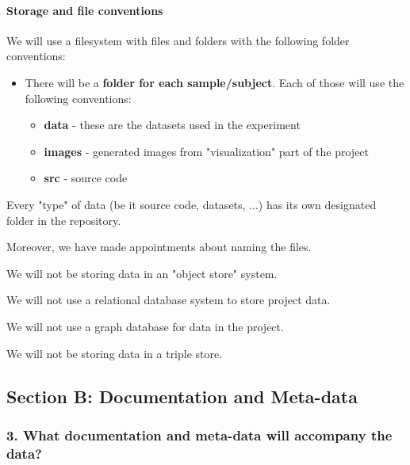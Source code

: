 \documentclass[
]{article}
\providecommand{\tightlist}{%
  \setlength{\itemsep}{0pt}\setlength{\parskip}{0pt}}
\begin{document}
\hypertarget{storage-and-file-conventions}{%
\paragraph{Storage and file
conventions}\label{storage-and-file-conventions}}

We will use a filesystem with files and folders with the following
folder conventions:

\begin{itemize}
\tightlist
\item
  There will be a \textbf{folder for each sample/subject}. Each of those
  will use the following conventions:
  \begin{itemize}
      \item \textbf{data} - these are the datasets used in the experiment
      \item \textbf{images} - generated images from "visualization" part of the project
      \item \textbf{src} - source code
  \end{itemize} 
\end{itemize}
Every "type" of data (be it source code, datasets, ...) has its own designated folder in the repository.

Moreover, we have made appointments about naming the files.

We will not be storing data in an "object store" system.

We will not use a relational database system to store project data.

We will not use a graph database for data in the project.

We will not be storing data in a triple store.

\hypertarget{sec-docs-metadata}{}
\hypertarget{section-b-documentation-and-meta-data}{%
\subsection{Section B: Documentation and
Meta-data}\label{section-b-documentation-and-meta-data}}

\hypertarget{q-docs-metadata}{}
\hypertarget{what-documentation-and-meta-data-will-accompany-the-data}{%
\subsubsection{3. What documentation and meta-data will accompany the
data?}\label{what-documentation-and-meta-data-will-accompany-the-data}}
\end{document}
